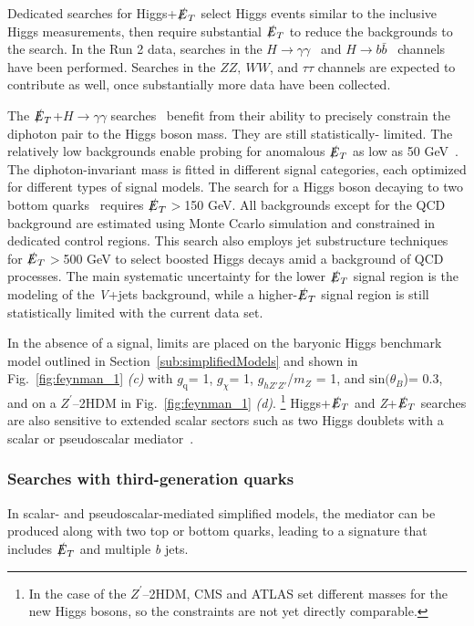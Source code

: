 \documentclass{ar-1col}
\newcommand{\chiDM}{\ensuremath{\chi}\xspace}
\newcommand{\gDM}{\ensuremath{g_{\chiDM}}\xspace}
\newcommand{\gdm}{\gDM}
\newcommand{\gq}{$g_{\mathrm{q}}$\xspace}
\newcommand{\ghZprimeZprime}{\ensuremath{g_{hZ'Z'}}\xspace}
\newcommand{\sinthetab}{\ensuremath{\mathrm{sin}(\theta_B})\xspace}
\newcommand{\MET}{\ensuremath{\slashed{E}_T}\xspace}
\newcommand{\Zprime}{\ensuremath{{Z}^\prime}\xspace}
\begin{document}
Dedicated searches for Higgs+\MET  select Higgs events similar to
the inclusive Higgs measurements, then require substantial \MET to
reduce the backgrounds to the search. In the Run 2 data, searches
in the $H \rightarrow
\gamma\gamma$~\cite{CMS-PAS-EXO-16-054,Aaboud:2017uak} and $H
\rightarrow b\bar{b}$~\cite{Aaboud:2017yqz} channels have been
performed. Searches in the $ZZ,~WW$, and $\tau\tau$ channels are
expected to contribute as well, once substantially more data have been
collected.

The \MET+$H \rightarrow \gamma\gamma$
searches~\cite{CMS-PAS-EXO-16-054,Aaboud:2017uak} benefit from
their ability to precisely constrain the diphoton pair to the
Higgs boson mass. They are still statistically- limited. The
relatively low backgrounds enable probing for anomalous \MET as low
as 50 GeV~\cite{CMS-PAS-EXO-16-054}. The diphoton-invariant mass
is fitted in different signal categories, each optimized for
different types of signal models. The search for a Higgs boson decaying to
two bottom quarks~\cite{Aaboud:2017yqz} requires \MET$>$150 GeV.
All backgrounds except for the QCD background are estimated using
Monte Ccarlo simulation and constrained in dedicated control regions. This search
also employs jet substructure techniques for \MET$>$500 GeV to
select boosted Higgs decays amid a background of QCD processes.
The main systematic uncertainty for the lower \MET signal region
is the modeling of the \textit{V}+jets background, while a higher-\MET
signal region is still statistically limited with the current
data set.

In the absence of a signal, limits are placed on the baryonic Higgs benchmark
model outlined in Section~\ref{sub:simplifiedModels} and shown in Fig.~\ref{fig:feynman_1} \textit{(c)}
with \gq = 1, \gdm = 1, \ghZprimeZprime/$m_{Z}$ = 1, and \sinthetab = 0.3, and on a
\Zprime--2HDM in Fig.~\ref{fig:feynman_1} \textit{(d)}.
\footnote{In the case of the \Zprime--2HDM, CMS and ATLAS set different masses for the new Higgs
bosons, so the constraints are not yet directly comparable.} 
Higgs+\MET and \textit{Z}+\MET searches are also sensitive to extended
scalar sectors such as two Higgs doublets with a scalar or
pseudoscalar mediator~\cite{Bauer:2017ota,Goncalves:2016iyg,Bell:2016ekl}.

\subsubsection{Searches with third-generation quarks}

In scalar- and pseudoscalar-mediated simplified models, 
the mediator can be produced along with two top or
bottom quarks, leading to a signature that includes \MET and multiple \textit{b} jets.
\end{document}
